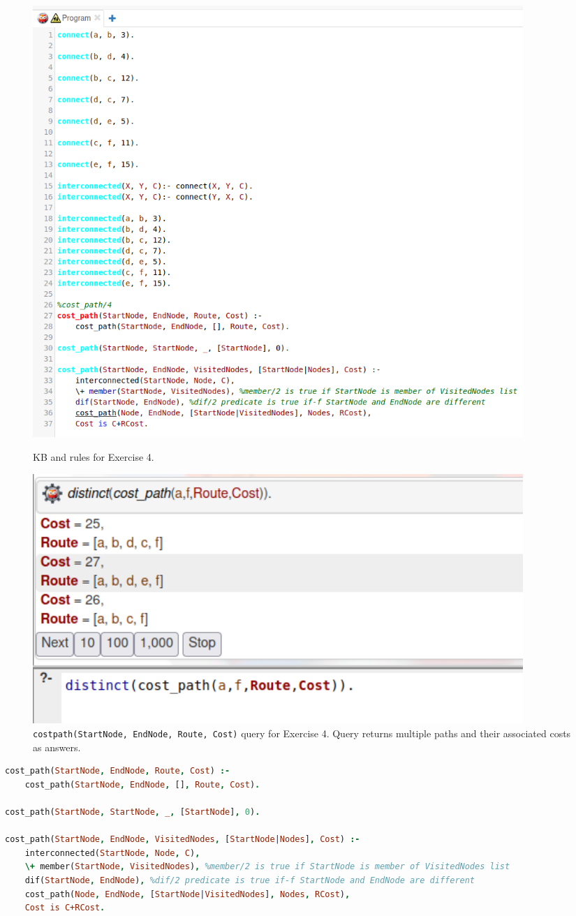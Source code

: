 \documentclass{article}
\def\code#1{\texttt{#1}}
\begin{document}
     \begin{figure}
    	\centering
    	\begin{minipage}{0.55\textwidth}
    		\centering
    		\includegraphics[width=0.9\textwidth]{images/ex4_input} %
    		\caption{KB and rules for Exercise 4.}
    	\end{minipage}\hfill
    	\begin{minipage}{0.45\textwidth}
    		\centering
    		\includegraphics[width=0.9\textwidth]{images/ex4_output} %
    		\caption{\code{cost\textunderscore path(StartNode, EndNode, Route, Cost)} query for Exercise 4. Query returns multiple paths and their associated costs as answers.}
    	\end{minipage}
    \end{figure}

   \begin{lstlisting}[language=Prolog]
%cost_path/4
cost_path(StartNode, EndNode, Route, Cost) :-
    cost_path(StartNode, EndNode, [], Route, Cost).

cost_path(StartNode, StartNode, _, [StartNode], 0).

cost_path(StartNode, EndNode, VisitedNodes, [StartNode|Nodes], Cost) :-
    interconnected(StartNode, Node, C),
    \+ member(StartNode, VisitedNodes), %member/2 is true if StartNode is member of VisitedNodes list
    dif(StartNode, EndNode), %dif/2 predicate is true if-f StartNode and EndNode are different
    cost_path(Node, EndNode, [StartNode|VisitedNodes], Nodes, RCost),
    Cost is C+RCost.
    \end{lstlisting}
\end{document}
